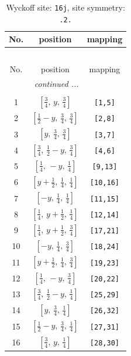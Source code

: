 \documentclass[fleqn,8pt]{jsarticle}
\begin{document}
\renewcommand{\arraystretch}{1.2}
\begin{longtable}{ccc}
\caption{Wyckoff site: {\tt 16j}, site symmetry: {\tt .2.}}
 \\
 \hline \hline
No. & position & mapping \\ \hline \endfirsthead

\multicolumn{2}{l}{\tablename\ \thetable{}} \\
 \hline \hline
No. & position & mapping \\ \hline \endhead

 \hline \hline
\multicolumn{2}{r}{\footnotesize\it continued ...} \\ \endfoot

 \hline \hline
\multicolumn{2}{r}{} \\ \endlastfoot

1 & $\left[ \frac{3}{4},\, y,\, \frac{3}{4} \right]$ & {\tt [1,5]} \\ \hline
2 & $\left[ \frac{1}{2} - y,\, \frac{3}{4},\, \frac{3}{4} \right]$ & {\tt [2,8]} \\ \hline
3 & $\left[ y,\, \frac{3}{4},\, \frac{3}{4} \right]$ & {\tt [3,7]} \\ \hline
4 & $\left[ \frac{3}{4},\, \frac{1}{2} - y,\, \frac{3}{4} \right]$ & {\tt [4,6]} \\ \hline
5 & $\left[ \frac{1}{4},\, - y,\, \frac{1}{4} \right]$ & {\tt [9,13]} \\ \hline
6 & $\left[ y + \frac{1}{2},\, \frac{1}{4},\, \frac{1}{4} \right]$ & {\tt [10,16]} \\ \hline
7 & $\left[ - y,\, \frac{1}{4},\, \frac{1}{4} \right]$ & {\tt [11,15]} \\ \hline
8 & $\left[ \frac{1}{4},\, y + \frac{1}{2},\, \frac{1}{4} \right]$ & {\tt [12,14]} \\ \hline
9 & $\left[ \frac{1}{4},\, y + \frac{1}{2},\, \frac{3}{4} \right]$ & {\tt [17,21]} \\ \hline
10 & $\left[ - y,\, \frac{1}{4},\, \frac{3}{4} \right]$ & {\tt [18,24]} \\ \hline
11 & $\left[ y + \frac{1}{2},\, \frac{1}{4},\, \frac{3}{4} \right]$ & {\tt [19,23]} \\ \hline
12 & $\left[ \frac{1}{4},\, - y,\, \frac{3}{4} \right]$ & {\tt [20,22]} \\ \hline
13 & $\left[ \frac{3}{4},\, \frac{1}{2} - y,\, \frac{1}{4} \right]$ & {\tt [25,29]} \\ \hline
14 & $\left[ y,\, \frac{3}{4},\, \frac{1}{4} \right]$ & {\tt [26,32]} \\ \hline
15 & $\left[ \frac{1}{2} - y,\, \frac{3}{4},\, \frac{1}{4} \right]$ & {\tt [27,31]} \\ \hline
16 & $\left[ \frac{3}{4},\, y,\, \frac{1}{4} \right]$ & {\tt [28,30]} \\
\end{longtable}
\end{document}
